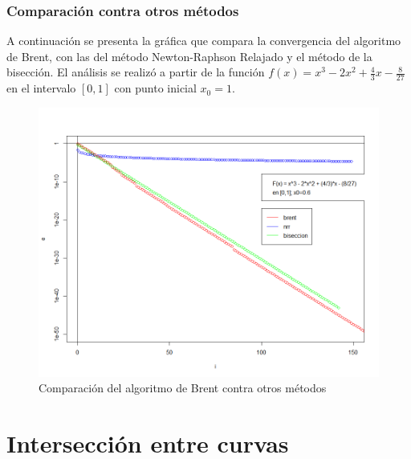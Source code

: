 \documentclass[a4paper,12pt]{article}
\begin{document}
\newpage

\subsubsection{Comparación contra otros métodos}

A continuación se presenta la gráfica que compara la convergencia del algoritmo de Brent, con las del método Newton-Raphson Relajado y el método de la bisección. El análisis se realizó a partir de la función $f(x)=x^3-2x^2+\frac{4}{3}x-\frac{8}{27}$ en el intervalo $[0,1]$ con punto inicial $x_0 = 1$. \par

\vspace{-1em}
\begin{figure}[ht!]
\centering
\includegraphics[scale=0.6]{img/brent_vs_metodos.png}
\vspace{-1em}
\caption{Comparación del algoritmo de Brent contra otros métodos}
\label{fig:brent_vs_metodos}
\end{figure}

\newpage


\section{Intersección entre curvas}
\end{document}
